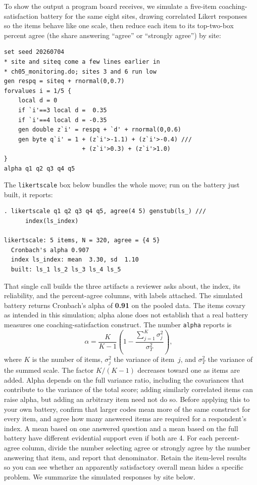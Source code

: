 \documentclass[
    a4paper,
    fontsize=10pt,
    twoside=true,
    numbers=noenddot,
]{kaobook}
\begin{document}
To show the output a program board receives, we simulate a five-item coaching-satisfaction battery for the same eight sites, drawing correlated Likert responses so the items behave like one scale, then reduce each item to its top-two-box percent agree (the share answering \enquote{agree} or \enquote{strongly agree}) by site:
\par
{\footnotesize
\begin{verbatim}
set seed 20260704
* site and siteq come a few lines earlier in
* ch05_monitoring.do; sites 3 and 6 run low
gen respq = siteq + rnormal(0,0.7)
forvalues i = 1/5 {
    local d = 0
    if `i'==3 local d =  0.35
    if `i'==4 local d = -0.35
    gen double z`i' = respq + `d' + rnormal(0,0.6)
    gen byte q`i' = 1 + (z`i'>-1.1) + (z`i'>-0.4) ///
                      + (z`i'>0.3) + (z`i'>1.0)
}
alpha q1 q2 q3 q4 q5
\end{verbatim}
}
The \texttt{likertscale} box below bundles the whole move; run on the battery just built, it reports:
\par
{\footnotesize
\begin{verbatim}
. likertscale q1 q2 q3 q4 q5, agree(4 5) genstub(ls_) ///
      index(ls_index)

likertscale: 5 items, N = 320, agree = {4 5}
  Cronbach's alpha 0.907
  index ls_index: mean  3.30, sd  1.10
  built: ls_1 ls_2 ls_3 ls_4 ls_5
\end{verbatim}
}
That single call builds the three artifacts a reviewer asks about, the index, its reliability, and the percent-agree columns, with labels attached.
The simulated battery returns Cronbach's alpha of \textbf{0.91} on the pooled data. The items covary as intended in this simulation; alpha alone does not establish that a real battery measures one coaching-satisfaction construct. The number \texttt{alpha} reports is
\[
  \alpha=\frac{K}{K-1}\left(1-\frac{\sum_{j=1}^{K}\sigma_j^2}{\sigma_T^2}\right),
\]
where $K$ is the number of items, $\sigma_j^2$ the variance of item~$j$, and $\sigma_T^2$ the variance of the summed scale. The factor $K/(K-1)$ decreases toward one as items are added. Alpha depends on the full variance ratio, including the covariances that contribute to the variance of the total score; adding similarly correlated items can raise alpha, but adding an arbitrary item need not do so. Before applying this to your own battery, confirm that larger codes mean more of the same construct for every item, and agree how many answered items are required for a respondent's index. A mean based on one answered question and a mean based on the full battery have different evidential support even if both are 4. For each percent-agree column, divide the number selecting agree or strongly agree by the number answering that item, and report that denominator. Retain the item-level results so you can see whether an apparently satisfactory overall mean hides a specific problem. We summarize the simulated responses by site below.
\end{document}
